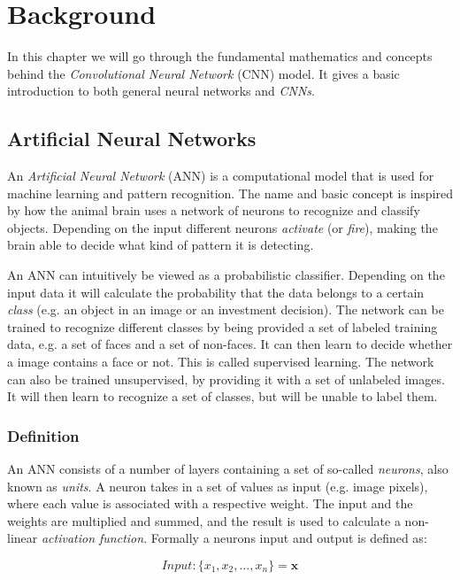 \chapter{Background}

In this chapter we will go through the fundamental mathematics and concepts behind the \textit{Convolutional Neural Network} (CNN) model. It gives a basic introduction to both general neural networks and \textit{CNNs}.

\section{Artificial Neural Networks}\label{ann}

An \textit{Artificial Neural Network} (ANN) \cite{Minsky1969}\cite{Bishop2006} is a computational model that is used for machine learning and pattern recognition. The name and basic concept is inspired by how the animal brain uses a network of neurons to recognize and classify objects. Depending on the input different neurons \textit{activate} (or \textit{fire}), making the brain able to decide what kind of pattern it is detecting. 

An ANN can intuitively be viewed as a probabilistic classifier. Depending on the input data it will calculate the probability that the data belongs to a certain \textit{class} (e.g. an object in an image or an investment decision). The network can be trained to recognize different classes by being provided a set of labeled training data, e.g. a set of faces and a set of non-faces. It can then learn to decide whether a image contains a face or not. This is called supervised learning. The network can also be trained unsupervised, by providing it with a set of unlabeled images. It will then learn to recognize a set of classes, but will be unable to label them.  

\subsection{Definition} \hfill \break
An ANN  consists of a number of layers containing a set of so-called \textit{neurons}, also known as \textit{units}. A neuron takes in a set of values as input (e.g. image pixels), where each value is associated with a respective weight. The input and the weights are multiplied and summed, and the result is used to calculate a non-linear \textit{activation function}. Formally a neurons input and output is defined as:


\begin{equation}\label{eq_neuron_in}
Input: \{x_1, x_2,\dots, x_n\} = \mathbf{x} 
\end{equation}

